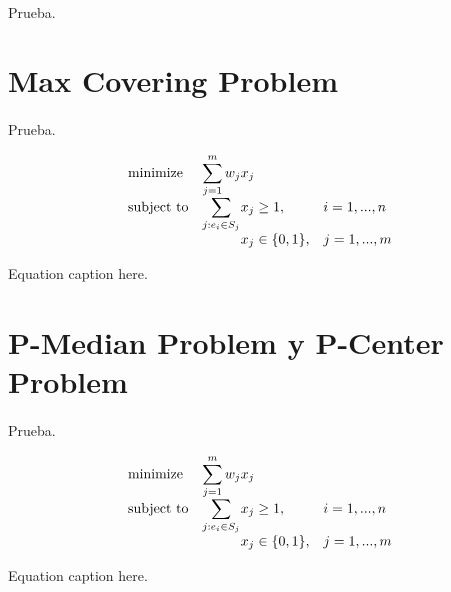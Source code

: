\documentclass[spanish]{article}
\begin{document}
		\paragraph{}
		Prueba.



	\section{Max Covering Problem}

		\paragraph{}
		Prueba.

		\begin{eqfloat}
			\begin{equation}
				\begin{array}{ll@{}ll}
				\text{minimize}  & \displaystyle\sum\limits_{j=1}^{m} w_{j}&x_{j} &\\
				\text{subject to}& \displaystyle\sum\limits_{j:e_{i} \in S_{j}}   &x_{j} \geq 1,  &i=1 ,..., n\\
												 &                                                &x_{j} \in \{0,1\}, &j=1 ,..., m
				\end{array}
			\end{equation}
      \caption{Equation caption here.}
      \label{eq:max_covering}
    \end{eqfloat}


	\section{P-Median Problem y P-Center Problem}

		\paragraph{}
		Prueba.

		\begin{eqfloat}
			\begin{equation}
				\begin{array}{ll@{}ll}
				\text{minimize}  & \displaystyle\sum\limits_{j=1}^{m} w_{j}&x_{j} &\\
				\text{subject to}& \displaystyle\sum\limits_{j:e_{i} \in S_{j}}   &x_{j} \geq 1,  &i=1 ,..., n\\
												 &                                                &x_{j} \in \{0,1\}, &j=1 ,..., m
				\end{array}
			\end{equation}
      \caption{Equation caption here.}
      \label{eq:p_median}
    \end{eqfloat}
\end{document}
